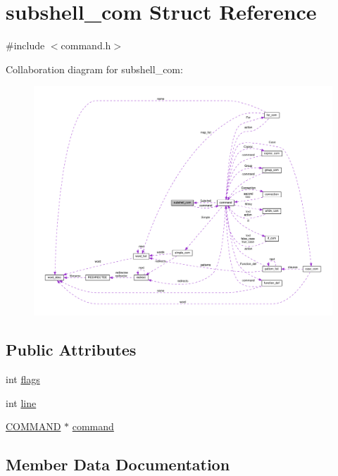 \hypertarget{structsubshell__com}{}\section{subshell\+\_\+com Struct Reference}
\label{structsubshell__com}


{\ttfamily \#include $<$command.\+h$>$}



Collaboration diagram for subshell\+\_\+com\+:
\nopagebreak
\begin{figure}[H]
\begin{center}
\leavevmode
\includegraphics[width=350pt]{structsubshell__com__coll__graph}
\end{center}
\end{figure}
\subsection*{Public Attributes}
\begin{DoxyCompactItemize}
\item 
int \hyperlink{structsubshell__com_a0edd264e3360fbdefe14faf33c66b54f}{flags}
\item 
int \hyperlink{structsubshell__com_a3c67c5a0510a7e48b1a50b80ae58d7dc}{line}
\item 
\hyperlink{command_8h_a8c41dec142c299806885773c902c0d87}{C\+O\+M\+M\+A\+ND} $\ast$ \hyperlink{structsubshell__com_aedbe947202b66c67bc19e14509b6690b}{command}
\end{DoxyCompactItemize}


\subsection{Member Data Documentation}
